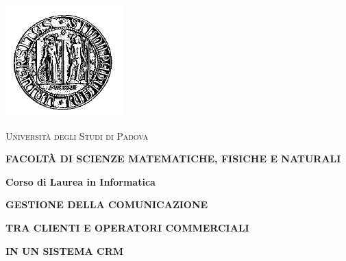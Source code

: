  
\usepackage{multirow}


\begin{titlepage}
\vspace{20pt}

\begin{center}
\includegraphics[scale=0.7]{images/logo_uni}
\end{center}

\vspace{20pt}
\begin{center}

\begin{LARGE}\textsc{Universit\` a degli Studi di Padova}\end{LARGE}
\end{center}

\begin{center}
\textbf{\textsc{FACOLT\` A DI SCIENZE MATEMATICHE, FISICHE E NATURALI}}
\end{center}

\begin{center}
	\begin{large}
		\textbf{Corso di Laurea in Informatica}
	\end{large}
\end{center}

\vspace{30pt}

\begin{center}
	\begin{Large}
			\textbf{GESTIONE DELLA COMUNICAZIONE}
	\end{Large}
\end{center}			

\begin{center}
	\begin{Large}
			\textbf{TRA CLIENTI E OPERATORI COMMERCIALI}
	\end{Large}
\end{center}		


\begin{center}
	\begin{Large}
				\textbf{ IN UN SISTEMA CRM}
	\end{Large}
\end{center}		
\vspace{50pt}


\end{titlepage}
